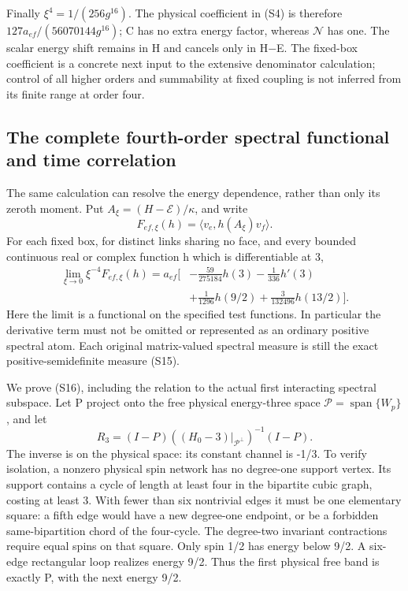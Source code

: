 Finally \(\xi^4=1/(256g^{16})\). The physical coefficient in (S4) is therefore \(127a_{ef}/(56070144g^{16})\); C has no extra energy factor, whereas \(\mathcal N\) has one. The scalar energy shift remains in H and cancels only in H\(-\)E. The fixed-box coefficient is a concrete next input to the extensive denominator calculation; control of all higher orders and summability at fixed coupling is not inferred from its finite range at order four.

\subsection{The complete fourth-order spectral functional and time correlation}\label{the-complete-fourth-order-spectral-functional-and-time-correlation}

The same calculation can resolve the energy dependence, rather than only its zeroth moment. Put \(A_\xi=(H-\mathcal E)/\kappa\), and write \[
 F_{ef,\xi}(h)=\langle v_e,h(A_\xi)v_f\rangle.
\] For each fixed box, for distinct links sharing no face, and every bounded continuous real or complex function h which is differentiable at 3, \[
\boxed{\begin{aligned}\lim_{\xi\to0}\xi^{-4}F_{ef,\xi}(h)
 =a_{ef}\biggl[&-\frac{59}{275184}h(3)-\frac1{336}h'(3)\\
             &+\frac1{1296}h(9/2)+\frac3{132496}h(13/2)\biggr].\end{aligned}}
\tag{S16}
\] Here the limit is a functional on the specified test functions. In particular the derivative term must not be omitted or represented as an ordinary positive spectral atom. Each original matrix-valued spectral measure is still the exact positive-semidefinite measure (S15).

We prove (S16), including the relation to the actual first interacting spectral subspace. Let P project onto the free physical energy-three space \(\mathcal P=\operatorname{span}\{W_p\}\), and let \[
 R_3=(I-P)((H_0-3)|_{\mathcal P^\perp})^{-1}(I-P).
\] The inverse is on the physical space: its constant channel is -1/3. To verify isolation, a nonzero physical spin network has no degree-one support vertex. Its support contains a cycle of length at least four in the bipartite cubic graph, costing at least 3. With fewer than six nontrivial edges it must be one elementary square: a fifth edge would have a new degree-one endpoint, or be a forbidden same-bipartition chord of the four-cycle. The degree-two invariant contractions require equal spins on that square. Only spin 1/2 has energy below 9/2. A six-edge rectangular loop realizes energy 9/2. Thus the first physical free band is exactly P, with the next energy 9/2.

